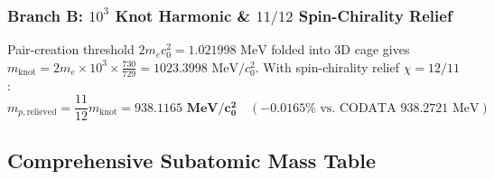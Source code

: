 \documentclass[11pt,a4paper]{article}
\begin{document}
\subsubsection{Branch B: $10^3$ Knot Harmonic \& $11/12$ Spin-Chirality Relief}
\label{subsubsec:branch_b}

Pair-creation threshold $2 m_e c_0^2 = 1.021998\text{ MeV}$ folded into 3D cage gives $m_{\text{knot}} = 2 m_e \times 10^3 \times \frac{730}{729} = 1023.3998\text{ MeV}/c_0^2$. With spin-chirality relief $\chi = 12/11$:
\begin{equation}
\boxed{m_{p,\text{relieved}} = \frac{11}{12} m_{\text{knot}} = \mathbf{938.1165\text{ MeV}/c_0^2} \quad (\mathbf{-0.0165\%}\text{ vs. CODATA } 938.2721\text{ MeV})}
\end{equation}

\subsection{Comprehensive Subatomic Mass Table}
\label{subsec:subatomic_table}
\end{document}
